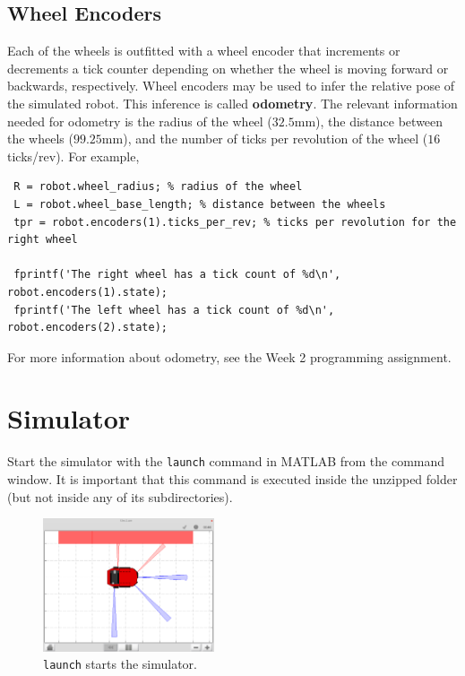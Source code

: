 \documentclass[10pt]{article}
\begin{document}
\subsection{Wheel Encoders}

Each of the wheels is outfitted with a wheel encoder that increments or decrements a tick counter depending on whether the wheel is moving forward or backwards, respectively. Wheel encoders may be used to infer the relative pose of the simulated robot. This inference is called \textbf{odometry}. The relevant information needed for odometry is the radius of the wheel ($32.5$mm), the distance between the wheels ($99.25$mm), and the number of ticks per revolution of the wheel ($16$ ticks/rev). For example,

\begin{verbatim}
 R = robot.wheel_radius; % radius of the wheel
 L = robot.wheel_base_length; % distance between the wheels
 tpr = robot.encoders(1).ticks_per_rev; % ticks per revolution for the right wheel

 fprintf('The right wheel has a tick count of %d\n', robot.encoders(1).state);
 fprintf('The left wheel has a tick count of %d\n', robot.encoders(2).state);
\end{verbatim}

For more information about odometry, see the Week 2 programming assignment.

\newpage
\section{Simulator}

Start the simulator with the \texttt{launch} command in MATLAB from the command window. It is important that this command is executed inside the unzipped folder (but not inside any of its subdirectories).

\begin{figure}[h]
  \centering
  \includegraphics[width=0.45\textwidth]{images/simiam-quickbot.png}
  \caption{\texttt{launch} starts the simulator.}
  \label{fig:simulator}
\end{figure}
\end{document}
